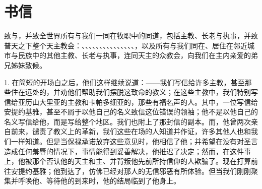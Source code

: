 
\chapter{书信}


\par

致与，并致全世界所有与我们一同在牧职中的同道，包括主教、长老与执事，并致普天之下整个天主教会：、、、、、、、、、、、、、、、，以及所有与我们同在、居住在邻近城市与民族中的其他主教、长老与执事，连同天主的众教会，向我们在主内亲爱的弟兄姊妹致候。\par

1. 在简短的开场白之后，他们这样继续说道：——我们写信给许多主教，甚至那些住在远处的，并劝他们帮助我们摆脱这致命的教义；在这些主教中，我们特别写信给亚历山大里亚的主教和卡帕多细亚的，那些有福名声的人。其中，一位写信给安提约基雅，甚至不屑于以他自己的名义致信这位错误的领袖；他不是以他自己的名义写信给他，而是写给整个地区。我们也附上了那封信的副本。而，他曾两次亲自前来，谴责了教义上的革新，我们这些在场的人知道并作证，许多其他人也和我们一样知道。但是当保禄承诺放弃这些意见时，他相信了他；并希望在没有对圣言造成任何羞辱的情况下，事情能得到妥善解决，他推迟了决定；然而，在这件事上，他被那个否认他的天主和主、并背叛他先前所持信仰的人欺骗了。现在打算前往安提约基雅；他到达了，仿佛已经对那人的无信邪恶有所体验。但当我们刚刚聚集并呼唤他、等待他的到来时，他的结局临到了他身上。\par


